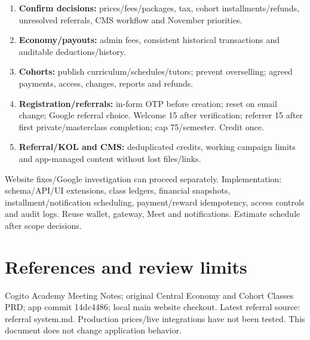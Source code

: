 \documentclass[11pt,a4paper]{article}
\begin{document}
\begin{enumerate}
\item \textbf{Confirm decisions:} prices/\allowbreak{}fees/\allowbreak{}packages, tax, cohort installments/\allowbreak{}refunds, unresolved referrals, CMS workflow and November priorities.
\item \textbf{Economy/\allowbreak{}payouts:} admin fees, consistent historical transactions and auditable deductions/\allowbreak{}history.
\item \textbf{Cohorts:} publish curriculum/\allowbreak{}schedules/\allowbreak{}tutors; prevent overselling; agreed payments, access, changes, reports and refunds.
\item \textbf{Registration/\allowbreak{}referrals:} in-form OTP before creation; reset on email change; Google referral choice. Welcome 15 after verification; referrer 15 after first private/\allowbreak{}masterclass completion; cap 75/\allowbreak{}semester. Credit once.
\item \textbf{Referral/\allowbreak{}KOL and CMS:} deduplicated credits, working campaign limits and app-managed content without lost files/\allowbreak{}links.
\end{enumerate}

Website fixes/\allowbreak{}Google investigation can proceed separately. Implementation: schema/\allowbreak{}API/\allowbreak{}UI extensions, class ledgers, financial snapshots, installment/\allowbreak{}notification scheduling, payment/\allowbreak{}reward idempotency, access controls and audit logs. Reuse wallet, gateway, Meet and notifications. Estimate schedule after scope decisions.

\section*{References and review limits}

Cogito Academy Meeting Notes; original Central Economy and Cohort Classes PRD; app commit 14dc4486; local main website checkout. Latest referral source: referral system.md. Production prices/\allowbreak{}live integrations have not been tested. This document does not change application behavior.
\end{document}
